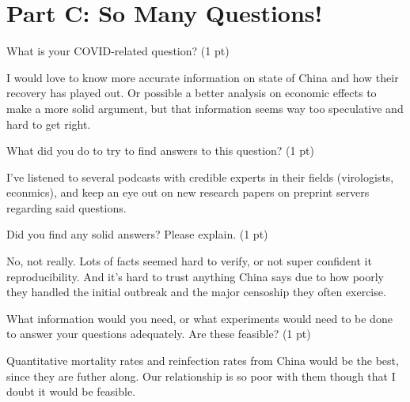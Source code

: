 \documentclass[12pt,a4paper]{article}
\begin{document}
\section*{Part C: So Many Questions!}
\begin{enumerate}[font=\bfseries, wide, resume]
    {\color{under}\item What is your COVID-related question? (1 pt)}
    
    I would love to know more accurate information on state of China and how their recovery has played out. Or possible a better analysis on economic effects to make a more solid argument, but that information seems way too speculative and hard to get right.
    
    {\color{under}\item What did you do to try to find answers to this question? (1 pt)}
    
    I've listened to several podcasts with credible experts in their fields (virologists, econmics), and keep an eye out on new research papers on preprint servers regarding said questions.
    
    {\color{under}\item Did you find any solid answers? Please explain. (1 pt)}
    
    No, not really. Lots of facts seemed hard to verify, or not super confident it reproducibility. And it's hard to trust anything China says due to how poorly they handled the initial outbreak and the major censoship they often exercise.

    {\color{under}\item What information would you need, or what experiments would need to be done to answer your questions adequately. Are these feasible? (1 pt)}

    Quantitative mortality rates and reinfection rates from China would be the best, since they are futher along. Our relationship is so poor with them though that I doubt it would be feasible.
    
\end{enumerate}
\end{document}
